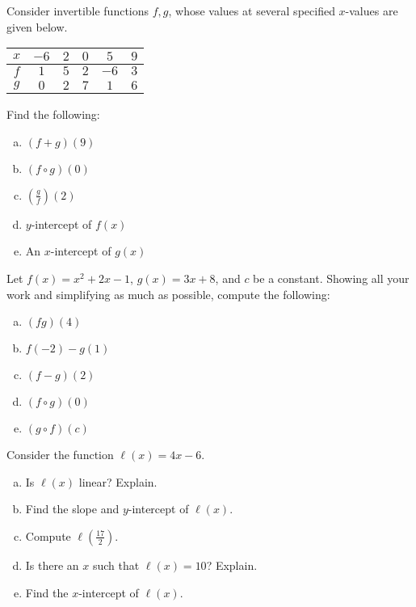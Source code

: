 \documentclass[12pt,letterpaper]{exam}
\begin{document}
\begin{questions}
\newpage
\question[10] Consider invertible functions $f, g$, whose values at several specified $x$-values are given below. 
	\begin{table}[h]
	\centering
	\begin{tabular}{|c||c|c|c|c|c|} \hline
	$x$ & $-6$ & $2$ & $0$ & $5$ & $9$ \\ \hline
	$f$ & $1$ & $5$ & $2$ & $-6$ & $3$ \\ \hline
	$g$ & $0$ & $2$ & $7$ & $1$ & $6$ \\ \hline
	\end{tabular}
	\end{table}
Find the following:
	\begin{enumerate}[(a)]
	\item $(f + g)(9)$
	\item $(f \circ g)(0)$
	\item $\left( \frac{g}{f} \right)(2)$
	\item $y$-intercept of $f(x)$
	\item An $x$-intercept of $g(x)$
	\end{enumerate}



\newpage
\question[10] Let $f(x)= x^2 + 2x - 1$, $g(x)= 3x + 8$, and $c$ be a constant. Showing all your work and simplifying as much as possible, compute the following:
	\begin{enumerate}[(a)]
	\item $(fg)(4)$
	\item $f(-2) - g(1)$
	\item $(f - g)(2)$
	\item $(f \circ g)(0)$
	\item $(g \circ f)(c)$
	\end{enumerate}



\newpage
\question[10] Consider the function $\ell(x)= 4x - 6$.
	\begin{enumerate}[(a)]
	\item Is $\ell(x)$ linear? Explain. 
	\item Find the slope and $y$-intercept of $\ell(x)$. 
	\item Compute $\ell(\frac{17}{2})$. 
	\item Is there an $x$ such that $\ell(x)= 10$? Explain. 
	\item Find the $x$-intercept of $\ell(x)$. 
	\end{enumerate}




\end{questions}
\end{document}
